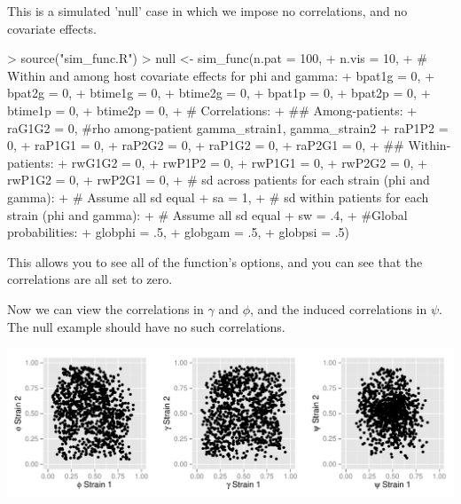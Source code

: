 \documentclass{article}
\begin{document}
This is a simulated 'null' case in which we impose no correlations, and no covariate effects. 
\begin{Schunk}
\begin{Sinput}
> source("sim_func.R")
> null <- sim_func(n.pat = 100,
+                      n.vis = 10, 
+                      # Within and among host covariate effects for phi and gamma:
+                      bpat1g = 0, 
+                      bpat2g = 0,
+                      btime1g = 0,
+                      btime2g = 0,
+                      bpat1p = 0,
+                      bpat2p = 0,
+                      btime1p = 0,
+                      btime2p = 0,
+                      # Correlations:
+                      ## Among-patients:
+                      raG1G2 = 0, #rho among-patient gamma_strain1, gamma_strain2
+                      raP1P2 = 0, 
+                      raP1G1 = 0,
+                      raP2G2 = 0,
+                      raP1G2 = 0,
+                      raP2G1 = 0,
+                      ## Within-patients:
+                      rwG1G2 = 0,
+                      rwP1P2 = 0, 
+                      rwP1G1 = 0,
+                      rwP2G2 = 0,
+                      rwP1G2 = 0,
+                      rwP2G1 = 0,
+                      # sd across patients for each strain (phi and gamma):
+                      # Assume all sd equal
+                      sa = 1,
+                      # sd within patients for each strain (phi and gamma):
+                      # Assume all sd equal
+                      sw = .4,
+                      #Global probabilities:
+                      globphi = .5, 
+                      globgam = .5, 
+                      globpsi = .5)
\end{Sinput}
\end{Schunk}
This allows you to see all of the function's options, and you can see that the correlations are all set to zero.

Now we can view the correlations in $\gamma$ and $\phi$, and the induced correlations in $\psi$. The null example should have no such correlations.

\begin{center}
\includegraphics{ReadMe-002}
\end{center}
\end{document}
